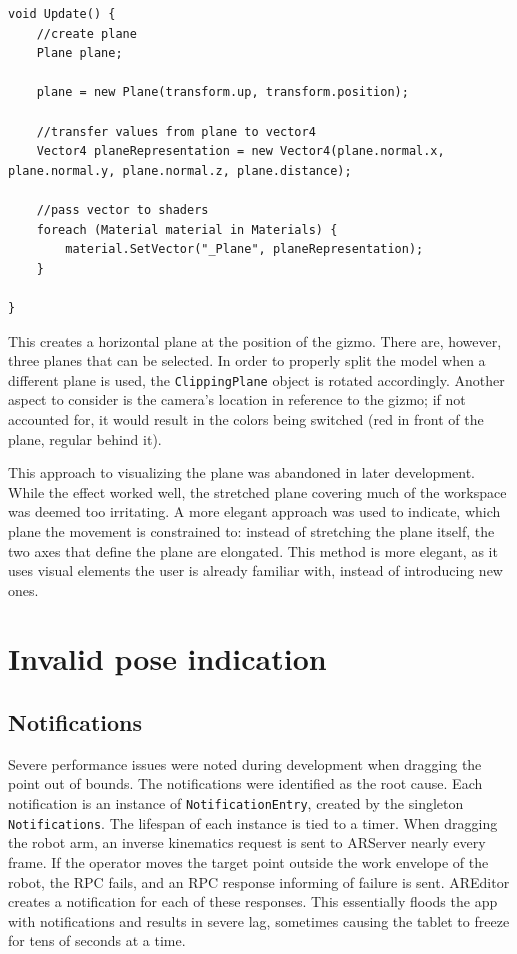 \begin{lstlisting}[style=sharpc, breaklines=true]
void Update() {
    //create plane
    Plane plane;
  
    plane = new Plane(transform.up, transform.position);
    
    //transfer values from plane to vector4
    Vector4 planeRepresentation = new Vector4(plane.normal.x, plane.normal.y, plane.normal.z, plane.distance);
    
    //pass vector to shaders
    foreach (Material material in Materials) {
        material.SetVector("_Plane", planeRepresentation);
    }
    
}
\end{lstlisting}


This creates a horizontal plane at the position of the gizmo. There are, however, three planes that can be selected. In order to properly split the model when a different plane is used, the \texttt{ClippingPlane} object is rotated accordingly. Another aspect to consider is the camera's location in reference to the gizmo; if not accounted for, it would result in the colors being switched (red in front of the plane, regular behind it).

This approach to visualizing the plane was abandoned in later development. While the effect worked well, the stretched plane covering much of the workspace was deemed too irritating. A more elegant approach was used to indicate, which plane the movement is constrained to: instead of stretching the plane itself, the two axes that define the plane are elongated. This method is more elegant, as it uses visual elements the user is already familiar with, instead of introducing new ones. 


\section{Invalid pose indication}


\subsection{Notifications}

Severe performance issues were noted during development when dragging the point out of bounds. The notifications were identified as the root cause. Each notification is an instance of \texttt{NotificationEntry}, created by the singleton \texttt{Notifications}. The lifespan of each instance is tied to a timer. When dragging the robot arm, an inverse kinematics request is sent to ARServer nearly every frame. If the operator moves the target point outside the work envelope of the robot, the RPC fails, and an RPC response informing of failure is sent. AREditor creates a notification for each of these responses. This essentially floods the app with notifications and results in severe lag, sometimes causing the tablet to freeze for tens of seconds at a time. 

